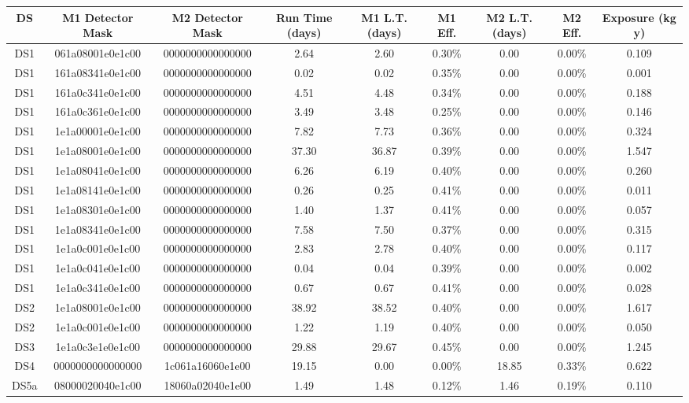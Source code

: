 \begin{tabular}{|c|c c|c|c c|c c|c|}
\hline
  DS & M1 Detector Mask & M2 Detector Mask & Run Time (days) & M1 L.T. (days) & M1 Eff. & M2 L.T. (days) & M2 Eff. & Exposure (kg y) \\
\hline
  DS1 & 061a08001e0e1c00 & 0000000000000000 & 2.64 & 2.60 & 0.30\% & 0.00 & 0.00\% & 0.109 \\
  DS1 & 161a08341e0e1c00 & 0000000000000000 & 0.02 & 0.02 & 0.35\% & 0.00 & 0.00\% & 0.001 \\
  DS1 & 161a0c341e0e1c00 & 0000000000000000 & 4.51 & 4.48 & 0.34\% & 0.00 & 0.00\% & 0.188 \\
  DS1 & 161a0c361e0e1c00 & 0000000000000000 & 3.49 & 3.48 & 0.25\% & 0.00 & 0.00\% & 0.146 \\
  DS1 & 1e1a00001e0e1c00 & 0000000000000000 & 7.82 & 7.73 & 0.36\% & 0.00 & 0.00\% & 0.324 \\
  DS1 & 1e1a08001e0e1c00 & 0000000000000000 & 37.30 & 36.87 & 0.39\% & 0.00 & 0.00\% & 1.547 \\
  DS1 & 1e1a08041e0e1c00 & 0000000000000000 & 6.26 & 6.19 & 0.40\% & 0.00 & 0.00\% & 0.260 \\
  DS1 & 1e1a08141e0e1c00 & 0000000000000000 & 0.26 & 0.25 & 0.41\% & 0.00 & 0.00\% & 0.011 \\
  DS1 & 1e1a08301e0e1c00 & 0000000000000000 & 1.40 & 1.37 & 0.41\% & 0.00 & 0.00\% & 0.057 \\
  DS1 & 1e1a08341e0e1c00 & 0000000000000000 & 7.58 & 7.50 & 0.37\% & 0.00 & 0.00\% & 0.315 \\
  DS1 & 1e1a0c001e0e1c00 & 0000000000000000 & 2.83 & 2.78 & 0.40\% & 0.00 & 0.00\% & 0.117 \\
  DS1 & 1e1a0c041e0e1c00 & 0000000000000000 & 0.04 & 0.04 & 0.39\% & 0.00 & 0.00\% & 0.002 \\
  DS1 & 1e1a0c341e0e1c00 & 0000000000000000 & 0.67 & 0.67 & 0.41\% & 0.00 & 0.00\% & 0.028 \\
  DS2 & 1e1a08001e0e1c00 & 0000000000000000 & 38.92 & 38.52 & 0.40\% & 0.00 & 0.00\% & 1.617 \\
  DS2 & 1e1a0c001e0e1c00 & 0000000000000000 & 1.22 & 1.19 & 0.40\% & 0.00 & 0.00\% & 0.050 \\
  DS3 & 1e1a0c3e1e0e1c00 & 0000000000000000 & 29.88 & 29.67 & 0.45\% & 0.00 & 0.00\% & 1.245 \\
  DS4 & 0000000000000000 & 1c061a16060e1e00 & 19.15 & 0.00 & 0.00\% & 18.85 & 0.33\% & 0.622 \\
  DS5a & 08000020040e1c00 & 18060a02040e1e00 & 1.49 & 1.48 & 0.12\% & 1.46 & 0.19\% & 0.110 \\

\end{tabular}

